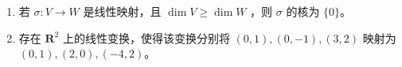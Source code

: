 \begin{enumerate}
\begin{enumerate}
        \item 若 \(\sigma\colon V\rightarrow W\) 是线性映射，且 \(\dim V \geqslant \dim W\) ，则 \(\sigma\) 的核为 \(\{0\}\)。

        \item 存在 \(\mathbf{R}^2\) 上的线性变换，使得该变换分别将 \((0,1),(0,-1),(3,2)\) 映射为 \((0,1),\allowbreak(2,0),\allowbreak(-4,2)\)。
    \end{enumerate}
\end{enumerate}

\clearpage
